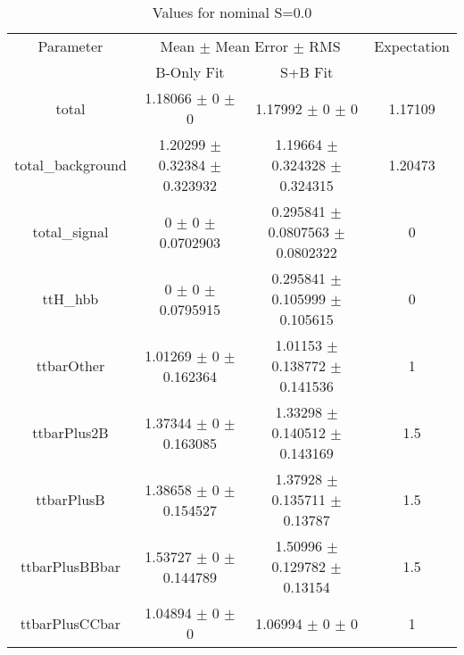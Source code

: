 \begin{table}
\centering
\caption{Values for nominal S=0.0}
\begin{tabular}{cccc}
\toprule
Parameter & \multicolumn{2}{c}{Mean $\pm$ Mean Error $\pm$ RMS} & Expectation\\
 & B-Only Fit & S+B Fit & \\
\midrule
total & \num{1.18066} $\pm$ \num{0} $\pm$ \num{0} & \num{1.17992} $\pm$ \num{0} $\pm$ \num{0} & \num{1.17109}\\
total\_background & \num{1.20299} $\pm$ \num{0.32384} $\pm$ \num{0.323932} & \num{1.19664} $\pm$ \num{0.324328} $\pm$ \num{0.324315} & \num{1.20473}\\
total\_signal & \num{0} $\pm$ \num{0} $\pm$ \num{0.0702903} & \num{0.295841} $\pm$ \num{0.0807563} $\pm$ \num{0.0802322} & \num{0}\\
ttH\_hbb & \num{0} $\pm$ \num{0} $\pm$ \num{0.0795915} & \num{0.295841} $\pm$ \num{0.105999} $\pm$ \num{0.105615} & \num{0}\\
ttbarOther & \num{1.01269} $\pm$ \num{0} $\pm$ \num{0.162364} & \num{1.01153} $\pm$ \num{0.138772} $\pm$ \num{0.141536} & \num{1}\\
ttbarPlus2B & \num{1.37344} $\pm$ \num{0} $\pm$ \num{0.163085} & \num{1.33298} $\pm$ \num{0.140512} $\pm$ \num{0.143169} & \num{1.5}\\
ttbarPlusB & \num{1.38658} $\pm$ \num{0} $\pm$ \num{0.154527} & \num{1.37928} $\pm$ \num{0.135711} $\pm$ \num{0.13787} & \num{1.5}\\
ttbarPlusBBbar & \num{1.53727} $\pm$ \num{0} $\pm$ \num{0.144789} & \num{1.50996} $\pm$ \num{0.129782} $\pm$ \num{0.13154} & \num{1.5}\\
ttbarPlusCCbar & \num{1.04894} $\pm$ \num{0} $\pm$ \num{0} & \num{1.06994} $\pm$ \num{0} $\pm$ \num{0} & \num{1}\\
\bottomrule
\end{tabular}
\end{table}